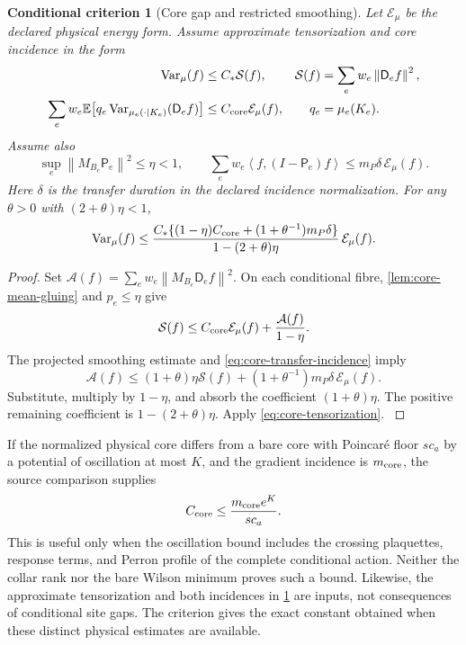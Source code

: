 \documentclass[11pt,oneside,openany]{book}
\newtheorem{criterion}[criterion]{Conditional criterion}
\theoremstyle{definition}
\theoremstyle{remark}
\newcommand{\E}{\mathbb E}
\newcommand{\Var}{\operatorname{Var}}
\newcommand{\norm}[1]{\left\lVert#1\right\rVert}
\newcommand{\ip}[2]{\left\langle#1,#2\right\rangle}
\newcommand{\src}[2]{\cite[#2]{#1}}
\begin{document}
\begin{criterion}[Core gap and restricted smoothing]
\label{crit:core-smoothing}
Let $\mathcal E_\mu$ be the declared physical energy form. Assume
approximate tensorization and core incidence in the form
\begin{align}
\Var_\mu(f)&\le C_*\mathcal S(f),
 &\mathcal S(f)&=\sum_e w_e\norm{\mathsf D_ef}^2,
 \label{eq:core-tensorization}\\
\sum_e w_e\E\!\left[q_e\Var_{\mu_e(\cdot\mid K_e)}
                    (\mathsf D_ef)\right]
 &\le C_{\rm core}\mathcal E_\mu(f),
 &q_e&=\mu_e(K_e). \label{eq:core-incidence}
\end{align}
Assume also
\begin{equation}\label{eq:core-transfer-incidence}
\sup_e\norm{M_{B_e}\mathsf P_e}^2\le\eta<1,
\qquad
\sum_e w_e\ip{f}{(I-\mathsf P_e)f}
\le m_P\delta\,\mathcal E_\mu(f).
\end{equation}
Here $\delta$ is the transfer duration in the declared incidence
normalization. For any $\theta>0$ with $(2+\theta)\eta<1$,
\begin{equation}\label{eq:core-smoothing-gap}
\Var_\mu(f)
\le
\frac{C_*\{(1-\eta)C_{\rm core}
 +(1+\theta^{-1})m_P\delta\}}
 {1-(2+\theta)\eta}\,\mathcal E_\mu(f).
\end{equation}
\end{criterion}
\begin{proof}
Set $\mathcal A(f)=\sum_e w_e\norm{M_{B_e}\mathsf D_ef}^2$.
On each conditional fibre, \cref{lem:core-mean-gluing} and
$p_e\le\eta$ give
\[
\mathcal S(f)\le C_{\rm core}\mathcal E_\mu(f)
 +\frac{\mathcal A(f)}{1-\eta}.
\]
The projected smoothing estimate and
\cref{eq:core-transfer-incidence} imply
\[
\mathcal A(f)\le(1+\theta)\eta\mathcal S(f)
 +(1+\theta^{-1})m_P\delta\,\mathcal E_\mu(f).
\]
Substitute, multiply by $1-\eta$, and absorb the coefficient
$(1+\theta)\eta$. The positive remaining coefficient is
$1-(2+\theta)\eta$. Apply \cref{eq:core-tensorization}.
\src{F6}{V97}
\end{proof}

If the normalized physical core differs from a bare core with
Poincar\'e floor $s c_a$ by a potential of oscillation at most $K$,
and the gradient incidence is $m_{\rm core}$, the source comparison
supplies
\begin{equation}\label{eq:core-oscillation}
C_{\rm core}\le\frac{m_{\rm core}e^K}{s c_a}.
\end{equation}
This is useful only when the oscillation bound includes the crossing
plaquettes, response terms, and Perron profile of the complete
conditional action. Neither the collar rank nor the bare Wilson
minimum proves such a bound. Likewise, the approximate tensorization
and both incidences in \cref{crit:core-smoothing} are inputs, not
consequences of conditional site gaps. The criterion gives the exact
constant obtained when these distinct physical estimates are available.
\end{document}
